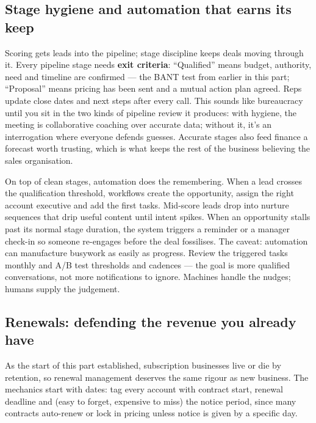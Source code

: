 \subsection{Stage hygiene and automation that earns its keep}


Scoring gets leads into the pipeline; stage discipline keeps deals moving through it. Every pipeline stage needs \textbf{exit criteria}: ``Qualified'' means budget, authority, need and timeline are confirmed — the BANT test from earlier in this part; ``Proposal'' means pricing has been sent and a mutual action plan agreed. Reps update close dates and next steps after every call. This sounds like bureaucracy until you sit in the two kinds of pipeline review it produces: with hygiene, the meeting is collaborative coaching over accurate data; without it, it's an interrogation where everyone defends guesses. Accurate stages also feed finance a forecast worth trusting, which is what keeps the rest of the business believing the sales organisation.


On top of clean stages, automation does the remembering. When a lead crosses the qualification threshold, workflows create the opportunity, assign the right account executive and add the first tasks. Mid-score leads drop into nurture sequences that drip useful content until intent spikes. When an opportunity stalls past its normal stage duration, the system triggers a reminder or a manager check-in so someone re-engages before the deal fossilises. The caveat: automation can manufacture busywork as easily as progress. Review the triggered tasks monthly and A/B test thresholds and cadences — the goal is more qualified conversations, not more notifications to ignore. Machines handle the nudges; humans supply the judgement.



\subsection{Renewals: defending the revenue you already have}


As the start of this part established, subscription businesses live or die by retention, so renewal management deserves the same rigour as new business. The mechanics start with dates: tag every account with contract start, renewal deadline and (easy to forget, expensive to miss) the notice period, since many contracts auto-renew or lock in pricing unless notice is given by a specific day.


